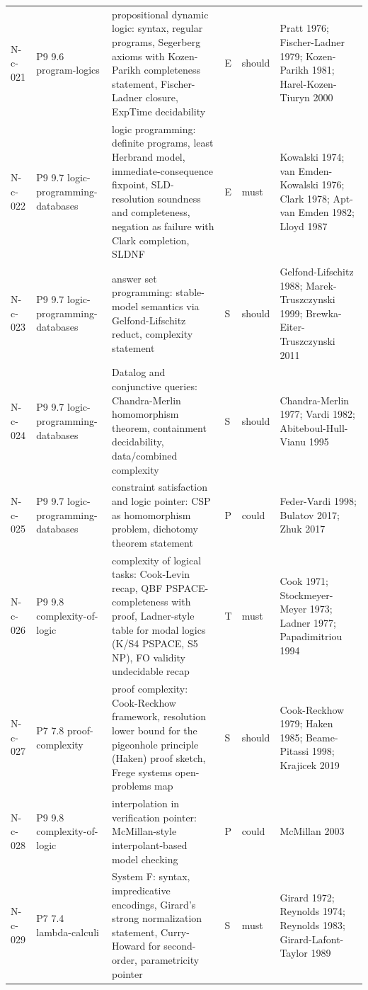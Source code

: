 \begin{longtable}{@{}p{0.52in}p{0.85in}p{2.5in}p{0.22in}p{0.42in}p{1.95in}@{}}
N-c-021 & P9 9.6 program-logics & propositional dynamic logic: syntax, regular programs, Segerberg axioms with Kozen-Parikh completeness statement, Fischer-Ladner closure, ExpTime decidability & E & should & Pratt 1976; Fischer-Ladner 1979; Kozen-Parikh 1981; Harel-Kozen-Tiuryn 2000 \\
N-c-022 & P9 9.7 logic-programming-databases & logic programming: definite programs, least Herbrand model, immediate-consequence fixpoint, SLD-resolution soundness and completeness, negation as failure with Clark completion, SLDNF & E & must & Kowalski 1974; van Emden-Kowalski 1976; Clark 1978; Apt-van Emden 1982; Lloyd 1987 \\
N-c-023 & P9 9.7 logic-programming-databases & answer set programming: stable-model semantics via Gelfond-Lifschitz reduct, complexity statement & S & should & Gelfond-Lifschitz 1988; Marek-Truszczynski 1999; Brewka-Eiter-Truszczynski 2011 \\
N-c-024 & P9 9.7 logic-programming-databases & Datalog and conjunctive queries: Chandra-Merlin homomorphism theorem, containment decidability, data/combined complexity & S & should & Chandra-Merlin 1977; Vardi 1982; Abiteboul-Hull-Vianu 1995 \\
N-c-025 & P9 9.7 logic-programming-databases & constraint satisfaction and logic pointer: CSP as homomorphism problem, dichotomy theorem statement & P & could & Feder-Vardi 1998; Bulatov 2017; Zhuk 2017 \\
N-c-026 & P9 9.8 complexity-of-logic & complexity of logical tasks: Cook-Levin recap, QBF PSPACE-completeness with proof, Ladner-style table for modal logics (K/S4 PSPACE, S5 NP), FO validity undecidable recap & T & must & Cook 1971; Stockmeyer-Meyer 1973; Ladner 1977; Papadimitriou 1994 \\
N-c-027 & P7 7.8 proof-complexity & proof complexity: Cook-Reckhow framework, resolution lower bound for the pigeonhole principle (Haken) proof sketch, Frege systems open-problems map & S & should & Cook-Reckhow 1979; Haken 1985; Beame-Pitassi 1998; Krajicek 2019 \\
N-c-028 & P9 9.8 complexity-of-logic & interpolation in verification pointer: McMillan-style interpolant-based model checking & P & could & McMillan 2003 \\
N-c-029 & P7 7.4 lambda-calculi & System F: syntax, impredicative encodings, Girard's strong normalization statement, Curry-Howard for second-order, parametricity pointer & S & must & Girard 1972; Reynolds 1974; Reynolds 1983; Girard-Lafont-Taylor 1989 \\

\end{longtable}

